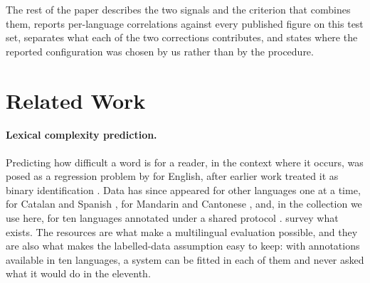 The rest of the paper describes the two signals and the criterion that
combines them, reports per-language correlations against every published
figure on this test set, separates what each of the two corrections
contributes, and states where the reported configuration was chosen by
us rather than by the procedure.

%
%
\section{Related Work}
\label{sec:related}

\paragraph{Lexical complexity prediction.} Predicting how difficult a
word is for a reader, in the context where it occurs, was posed as a
regression problem by \citet{shardlow-etal-2021-semeval} for English,
after earlier work treated it as binary identification
\citep{yimam-etal-2018-report}. Data has since appeared for other
languages one at a time, for Catalan and Spanish
\citep{saggion-etal-2024-lexical}, for Mandarin and Cantonese
\citep{qiu-etal-2024-complex}, and, in the collection we use here, for
ten languages annotated under a shared protocol
\citep{shardlow-etal-2024-bea}. \citet{shardlow-etal-2024-multilingual}
survey what exists. The resources are what make a multilingual
evaluation possible, and they are also what makes the labelled-data
assumption easy to keep: with annotations available in ten languages, a
system can be fitted in each of them and never asked what it would do in
the eleventh.

